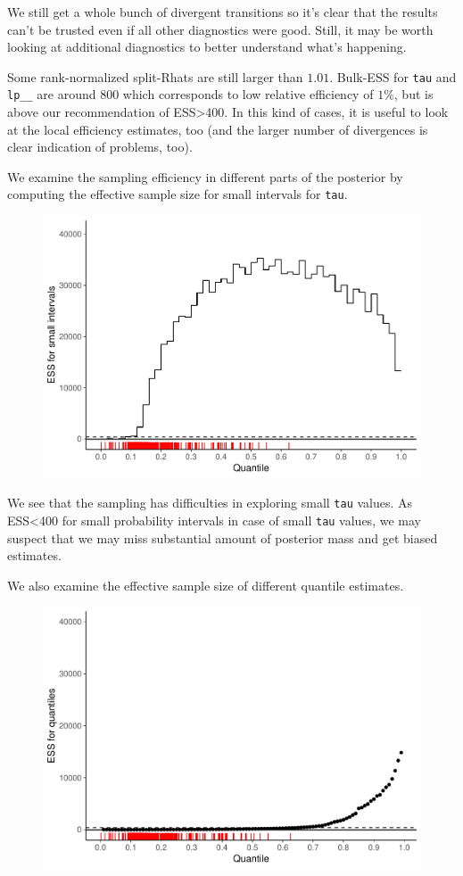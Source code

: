 \documentclass[american,]{article}
\begin{document}
We still get a whole bunch of divergent transitions so it's clear that
the results can't be trusted even if all other diagnostics were good.
Still, it may be worth looking at additional diagnostics to better
understand what's happening.

Some rank-normalized split-Rhats are still larger than \(1.01\).
Bulk-ESS for \texttt{tau} and \texttt{lp\_\_} are around 800 which
corresponds to low relative efficiency of \(1\%\), but is above our
recommendation of ESS\textgreater{}400. In this kind of cases, it is
useful to look at the local efficiency estimates, too (and the larger
number of divergences is clear indication of problems, too).

We examine the sampling efficiency in different parts of the posterior
by computing the effective sample size for small intervals for
\texttt{tau}.

\begin{figure}[tp]
  \centering
  \includegraphics[width=0.6\linewidth]{graphics/local-ess-fit-cp2-tau-1.pdf}
\end{figure}

We see that the sampling has difficulties in exploring small
\texttt{tau} values. As ESS\textless{}400 for small probability
intervals in case of small \texttt{tau} values, we may suspect that we
may miss substantial amount of posterior mass and get biased estimates.

We also examine the effective sample size of different quantile
estimates.

\begin{figure}[tp]
  \centering
  \includegraphics[width=0.6\linewidth]{graphics/quantile-ess-fit-cp2-tau-1.pdf}
\end{figure}
\end{document}
